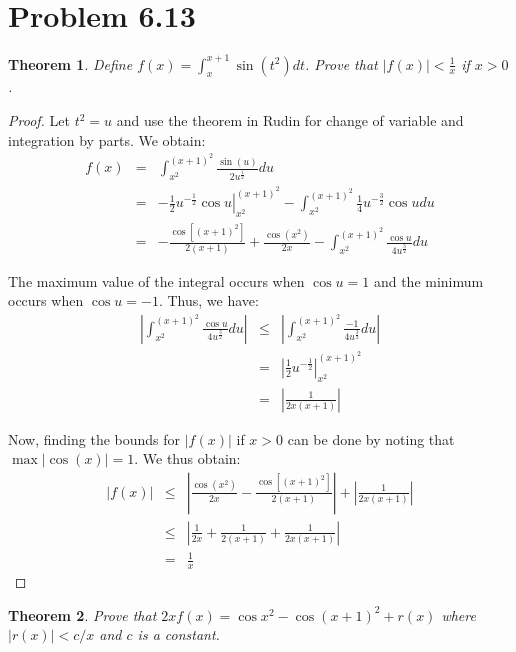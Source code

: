 \documentclass[psamsfonts]{amsart}
\newtheorem{thm}{Theorem}[section]
\theoremstyle{definition}
\theoremstyle{remark}
\numberwithin{equation}{section}
\begin{document}
\section{Problem 6.13}

\begin{thm}
Define $f(x) = \int_x^{x+1} \sin (t^2) dt$. Prove that $|f(x)| < \frac{1}{x}$ if $x > 0$. 
\end{thm}

\begin{proof}
Let $t^2 = u$ and use the theorem in Rudin for change of variable and integration by parts. We obtain:
\begin{eqnarray}
f(x) &=& \int_{x^2}^{(x+1)^2} \frac{\sin(u)}{2 u^{\frac{1}{2}}} du \\
&=& \left. -\frac{1}{2} u^{-\frac{1}{2}} \cos u \right|_{x^2}^{(x+1)^2} - \int_{x^2}^{(x+1)^2} \frac{1}{4} u^{-\frac{3}{2}} \cos u du \\
&=& -\frac{\cos[(x+1)^2]}{2(x+1)} + \frac{\cos(x^2)}{2 x} - \int_{x^2}^{(x+1)^2} \frac{\cos u}{4 u^{\frac{3}{2}}} du
\end{eqnarray}

The maximum value of the integral occurs when $\cos u = 1$ and the minimum occurs when $\cos u = -1$. Thus, we have:
\begin{eqnarray}
\left|  \int_{x^2}^{(x+1)^2} \frac{\cos u}{4 u^{\frac{3}{2}}} du \right| &\leq&  \left| \int_{x^2}^{(x+1)^2} \frac{-1}{4 u^{\frac{3}{2}}} du \right| \\
&=& \left|\frac{1}{2} u^{-\frac{1}{2}} \right|_{x^2}^{(x+1)^2} \\
&=& \left| \frac{1}{2x(x+1)} \right|
\end{eqnarray}

Now, finding the bounds for $|f(x)|$ if $x > 0$ can be done by noting that $\max |\cos(x)| = 1$. We thus obtain:
\begin{eqnarray}
|f(x)| &\leq& \left| \frac{\cos(x^2)}{2x} - \frac{ \cos[(x+1)^2]}{2(x+1)} \right| + \left| \frac{1}{2x(x+1)} \right|\\
&\leq& \left|\frac{1}{2x} + \frac{1}{2(x+1)} + \frac{1}{2x(x+1)} \right| \\
&=& \frac{1}{x}
\end{eqnarray}
\end{proof}

\begin{thm}
Prove that $2x f(x) = \cos x^2 - \cos (x+1)^2 + r(x)$ where $|r(x)| < c/x$ and $c$ is a constant.
\end{thm}
\end{document}
